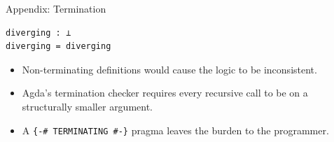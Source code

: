 \documentclass[10pt,compress,aspectratio=169]{beamer}
\begin{document}
\begin{frame}[fragile]{Appendix: Termination}
\begin{verbatim}
diverging : ⊥
diverging = diverging
\end{verbatim}
\begin{itemize}
    \item Non-terminating definitions would cause the logic to be inconsistent.
    \item Agda's termination checker requires every recursive call to be on a structurally smaller argument.
    \item A \texttt{\{-\# TERMINATING \#-\}} pragma leaves the burden to the programmer.
\end{itemize}
\end{frame}
\end{document}
